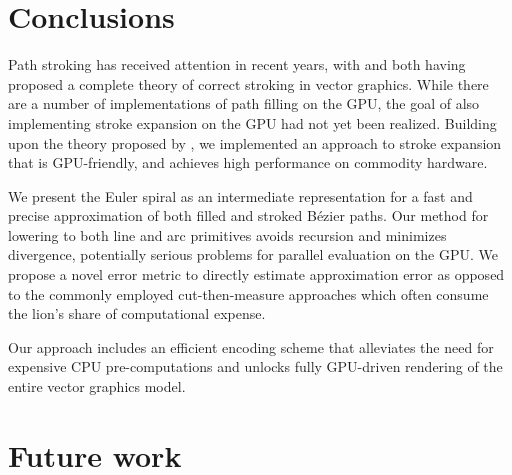 \documentclass[sigconf, nonacm]{acmart}
\begin{document}
\section{Conclusions}

Path stroking has received attention in recent years, with \citet{Nehab2020} and \citet{Kilgard2020} both having proposed a complete theory of correct stroking in vector graphics. While there are a number of implementations of path filling on the GPU, the goal of also implementing stroke expansion on the GPU had not yet been realized. Building upon the theory proposed by \citet{Nehab2020}, we implemented an approach to stroke expansion that is GPU-friendly, and achieves high performance on commodity hardware.

We present the Euler spiral as an intermediate representation for a fast and precise approximation of both filled and stroked Bézier paths. Our method for lowering to both line and arc primitives avoids recursion and minimizes divergence, potentially serious problems for parallel evaluation on the GPU.  We propose a novel error metric to directly estimate approximation error as opposed to the commonly employed cut-then-measure approaches which often consume the lion's share of computational expense.

Our approach includes an efficient encoding scheme that alleviates the need for expensive CPU pre-computations and unlocks fully GPU-driven rendering of the entire vector graphics model.

\section{Future work}
\end{document}
